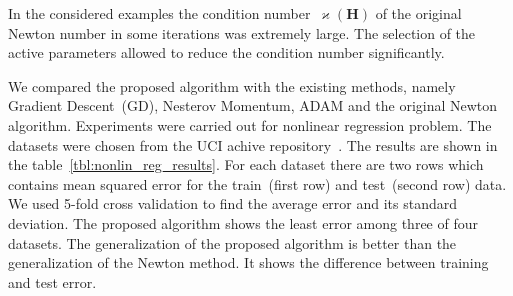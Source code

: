 \documentclass[a4paper,12pt]{article}
\renewcommand{\kappa}{\ensuremath{\varkappa}}
\theoremstyle{plain} %
\theoremstyle{definition} %
\theoremstyle{remark} %
\newcommand{\bH}{\mathbf{H}}
\begin{document}
	In the considered examples the condition number~$\kappa (\bH)$ of the original Newton number in some iterations was extremely large. 
	The selection of the active parameters allowed to reduce the condition number significantly. 
	
	We compared the proposed algorithm with the existing methods, namely Gradient Descent~(GD), Nesterov Momentum, ADAM and the original Newton algorithm. 
	Experiments were carried out for nonlinear regression problem. 
	The datasets were chosen from the UCI achive repository~\cite{uci2017}. 
	The results are shown in the table~\ref{tbl:nonlin_reg_results}. 
	For each dataset there are two rows which contains mean squared error for the train~(first row) and test~(second row) data. 
	We used 5-fold cross validation to find the average error and its standard deviation. 
	The proposed algorithm shows the least error among three of four datasets. 
	The generalization of the proposed algorithm is better than the generalization of the Newton method. 
	It shows the difference between training and test error.
\end{document}
